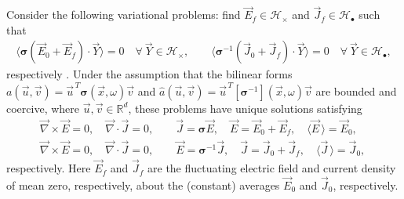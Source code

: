 \documentclass[english,12pt,jmp,graphicx]{revtex4-1}
\begin{document}
Consider the following variational problems: 
find $\vec{E}_f\in\mathscr{H}_\times$ and  $\vec{J}_f\in \mathscr{H}_{\bullet}$ such
that    
%
\begin{align}
  \label{eq:Weak_Curl_Free_Variational_Form}
 \langle\bm{\sigma}(\vec{E}_0+\vec{E}_f)\cdot\vec{Y}\rangle=0 \quad  \forall \
  \vec{Y}\in\mathscr{H}_\times,\qquad
%
 \langle\bm{\sigma}^{-1}(\vec{J}_0+\vec{J}_f)\cdot\vec{Y}\rangle=0 \quad  \forall \
  \vec{Y}\in\mathscr{H}_{\bullet},  
\end{align}
%
respectively \cite{Golden:CMP-473}. Under the assumption that the
bilinear forms
$a(\vec{u},\vec{v})=\vec{u}^{\,T}\bm{\sigma}(\vec{x},\omega)\vec{v}$ and
$\hat{a}(\vec{u},\vec{v})=\vec{u}^{\,T}[\bm{\sigma}^{-1}](\vec{x},\omega)\vec{v}$
are bounded and coercive, where $\vec{u},\vec{v}\in\mathbb{R}^d$, these
problems have unique solutions satisfying \cite{Golden:CMP-473} 
%
\begin{align}
  \label{eq:Maxwells_Equations_E}  
  &\vec{\nabla}\times\vec{E}=0, \quad
  \vec{\nabla}\cdot\vec{J}=0,\qquad 
  \vec{J}=\bm{\sigma}\vec{E},\quad
  \vec{E}=\vec{E}_0+\vec{E}_f, \quad
  \langle\vec{E}\,\rangle=\vec{E}_0,\\
%
  \label{eq:Maxwells_Equations_D}
   &\vec{\nabla}\times\vec{E}=0, \quad
   \vec{\nabla}\cdot\vec{J}=0, \qquad
   \vec{E}=\bm{\sigma}^{-1}\vec{J},\quad   
   \vec{J}=\vec{J}_0+\vec{J}_f,\quad
   \langle\vec{J}\,\rangle=\vec{J}_0,\quad
\end{align}
%
respectively. Here $\vec{E}_f$ and $\vec{J}_f$ are the fluctuating
electric field and current density of mean zero, respectively, about the
(constant) averages $\vec{E}_0$ and $\vec{J}_0$, respectively. 
\end{document}
